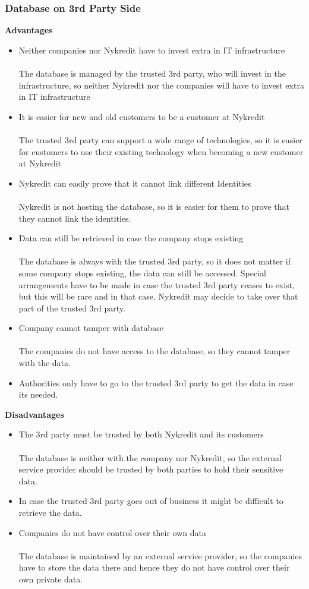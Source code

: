 \subsubsection{Database on 3rd Party Side}
\textbf{Advantages}
\begin{itemize}
	\item Neither companies nor Nykredit have to invest extra in IT infrastructure
	\\
	\\The database is managed by the trusted 3rd party, who will invest in the infrastructure, so neither Nykredit nor the companies will have to invest extra in IT infrastructure
	\item It is easier for new and old customers to be a customer at Nykredit
	\\
	\\The trusted 3rd party can support a wide range of technologies, so it is easier for customers to use their existing technology when becoming a new customer at Nykredit
	\item Nykredit can easily prove that it cannot link different Identities
	\\
	\\Nykredit is not hosting the database, so it is easier for them to prove that they cannot link the identities.
	\item Data can still be retrieved in case the company stops existing 
	\\
	\\The database is always with the trusted 3rd party, so it does not matter if some company stops existing, the data can still be accessed. Special arrangements have to be made in case the trusted 3rd party ceases to exist, but this will be rare and in that case, Nykredit may decide to take over that part of the trusted 3rd party.
	\item Company cannot tamper with database
	\\
	\\The companies do not have access to the database, so they cannot tamper with the data.
	\item Authorities only have to go to the trusted 3rd party to get the data in case its needed.
\end{itemize}
\textbf{Disadvantages}
\begin{itemize}
	\item The 3rd party must be trusted by both Nykredit and its customers
	\\
	\\The database is neither with the company nor Nykredit, so the external service provider should be trusted by both parties to hold their sensitive data.
	\item In case the trusted 3rd party goes out of business it might be difficult to retrieve the data.
	\item Companies do not have control over their own data
	\\
	\\The database is maintained by an external service provider, so the companies have to store the data there and hence they do not have control over their own private data.
\end{itemize}
